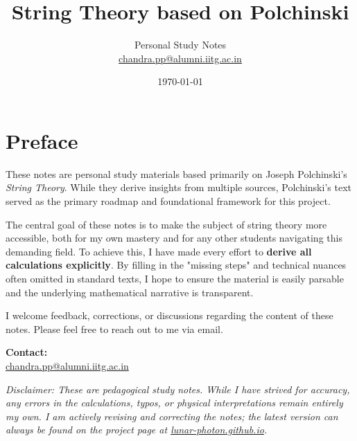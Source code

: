 \documentclass[11pt, oneside]{book}
\title{String Theory based on Polchinski}
\author{Personal Study Notes \\ \small \href{mailto:chandra.pp@alumni.iitg.ac.in}{chandra.pp@alumni.iitg.ac.in}}
\date{\today}
\numberwithin{equation}{section} %
\begin{document}
	
	\frontmatter
	
	\maketitle
	
	\chapter*{Preface}
	
	These notes are personal study materials based primarily on Joseph Polchinski’s \textit{String Theory}. While they derive insights from multiple sources, Polchinski’s text served as the primary roadmap and foundational framework for this project.
	
	The central goal of these notes is to make the subject of string theory more accessible, both for my own mastery and for any other students navigating this demanding field. To achieve this, I have made every effort to \textbf{derive all calculations explicitly}. By filling in the "missing steps" and technical nuances often omitted in standard texts, I hope to ensure the material is easily parsable and the underlying mathematical narrative is transparent.
	
	I welcome feedback, corrections, or discussions regarding the content of these notes. Please feel free to reach out to me via email.
	
	\vfill
	\begin{flushleft}
		\textbf{Contact:} \\
		\href{mailto:chandra.pp@alumni.iitg.ac.in}{chandra.pp@alumni.iitg.ac.in}
	\end{flushleft}
	
	\vspace{1cm}
	\noindent \textit{Disclaimer: These are pedagogical study notes. While I have strived for accuracy, any errors in the calculations, typos, or physical interpretations remain entirely my own. I am actively revising and correcting the notes; the latest version can always be found on the project page at \href{https://lunar-photon.github.io}{lunar-photon.github.io}.}
	
	\tableofcontents
	
	\mainmatter
	
	
	
	
	
	
	
	
	
	
	
	
	
	
\end{document}
